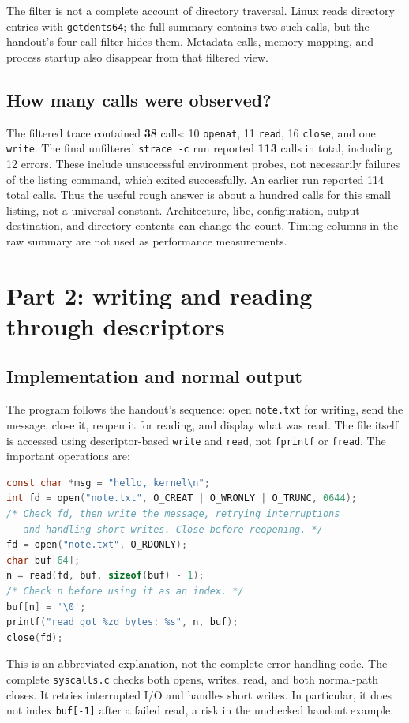 \documentclass[12pt]{article}
\begin{document}
The filter is not a complete account of directory traversal. Linux reads
directory entries with \texttt{getdents64}; the full summary contains two
such calls, but the handout's four-call filter hides them. Metadata calls,
memory mapping, and process startup also disappear from that filtered view.

\subsection{How many calls were observed?}
The filtered trace contained \textbf{38} calls: 10 \texttt{openat},
11 \texttt{read}, 16 \texttt{close}, and one \texttt{write}. The final
unfiltered \texttt{strace -c} run reported \textbf{113} calls in total,
including 12 errors. These include unsuccessful environment probes, not
necessarily failures of the listing command, which exited successfully.
An earlier run reported 114 total calls. Thus the useful rough answer is
about a hundred calls for this small listing, not a universal constant.
Architecture, libc, configuration, output destination, and directory
contents can change the count. Timing columns in the raw summary are not
used as performance measurements.

\clearpage
\section{Part 2: writing and reading through descriptors}
\subsection{Implementation and normal output}
The program follows the handout's sequence: open \texttt{note.txt} for
writing, send the message, close it, reopen it for reading, and display
what was read. The file itself is accessed using descriptor-based
\texttt{write} and \texttt{read}, not \texttt{fprintf} or \texttt{fread}.
The important operations are:
\begin{lstlisting}[language=C]
const char *msg = "hello, kernel\n";
int fd = open("note.txt", O_CREAT | O_WRONLY | O_TRUNC, 0644);
/* Check fd, then write the message, retrying interruptions
   and handling short writes. Close before reopening. */
fd = open("note.txt", O_RDONLY);
char buf[64];
n = read(fd, buf, sizeof(buf) - 1);
/* Check n before using it as an index. */
buf[n] = '\0';
printf("read got %zd bytes: %s", n, buf);
close(fd);
\end{lstlisting}
This is an abbreviated explanation, not the complete error-handling code.
The complete \texttt{syscalls.c} checks both opens, writes, read, and both
normal-path closes. It retries interrupted I/O and handles short writes.
In particular, it does not index \texttt{buf[-1]} after a failed read, a
risk in the unchecked handout example.
\end{document}
